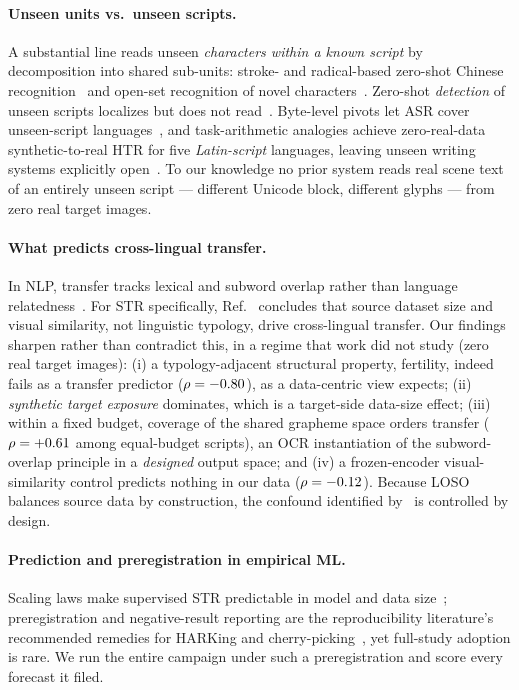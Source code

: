 \paragraph{Unseen units vs.\ unseen scripts.}
A substantial line reads unseen \emph{characters within a known script} by decomposition into
shared sub-units: stroke- and radical-based zero-shot Chinese
recognition~\cite{strokezs,star,hiercode} and open-set recognition of novel
characters~\cite{openset1,openset2,moose}. Zero-shot \emph{detection} of unseen scripts localizes
but does not read~\cite{unseendet}. Byte-level pivots let ASR cover unseen-script
languages~\cite{maestrou}, and task-arithmetic analogies achieve zero-real-data synthetic-to-real
HTR for five \emph{Latin-script} languages, leaving unseen writing systems explicitly
open~\cite{taskanalogies}. To our knowledge no prior system reads real scene text of an entirely
unseen script --- different Unicode block, different glyphs --- from zero real target images.

\paragraph{What predicts cross-lingual transfer.}
In NLP, transfer tracks lexical and subword overlap rather than language
relatedness~\cite{subwordoverlap,overlap2}. For STR specifically, Ref.~\cite{crosslingstr}
concludes that source dataset size and visual similarity, not linguistic typology, drive
cross-lingual transfer. Our findings sharpen rather than contradict this, in a regime that work
did not study (zero real target images): (i) a typology-adjacent structural property, fertility,
indeed fails as a transfer predictor ($\rho=-0.80$), as a data-centric view expects;
(ii) \emph{synthetic target exposure} dominates, which is a target-side data-size effect;
(iii) within a fixed budget, coverage of the shared grapheme space orders transfer
($\rho=+0.61$ among equal-budget scripts), an OCR instantiation of the subword-overlap
principle in a \emph{designed} output space; and (iv) a frozen-encoder visual-similarity control
predicts nothing in our data ($\rho=-0.12$). Because LOSO balances source data by construction,
the confound identified by~\cite{crosslingstr} is controlled by design.

\paragraph{Prediction and preregistration in empirical ML.}
Scaling laws make supervised STR predictable in model and data size~\cite{strscaling};
preregistration and negative-result reporting are the reproducibility literature's recommended
remedies for HARKing and cherry-picking~\cite{preregml,repro}, yet full-study adoption is rare.
We run the entire campaign under such a preregistration and score every forecast it filed.
